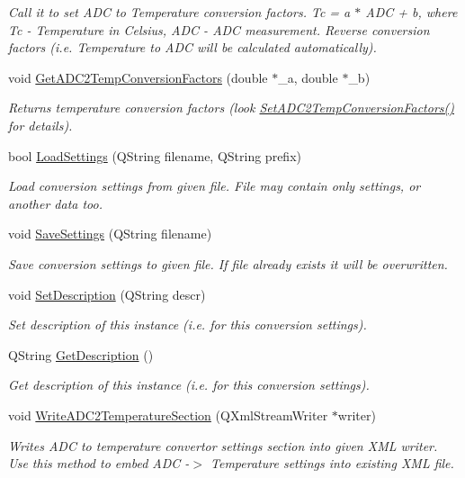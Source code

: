 \begin{DoxyCompactItemize}
\begin{DoxyCompactList}\small\item\em Call it to set A\+DC to Temperature conversion factors. Tc = a $\ast$ A\+DC + b, where Tc -\/ Temperature in Celsius, A\+DC -\/ A\+DC measurement. Reverse conversion factors (i.\+e. Temperature to A\+DC will be calculated automatically). \end{DoxyCompactList}\item 
void \hyperlink{class_adc_temperature_convertor_af7c23effdc32aa35c14813fd334572f2}{Get\+A\+D\+C2\+Temp\+Conversion\+Factors} (double $\ast$\+\_\+a, double $\ast$\+\_\+b)
\begin{DoxyCompactList}\small\item\em Returns temperature conversion factors (look \hyperlink{class_adc_temperature_convertor_a4850843e55992608213cc9cf82d36830}{Set\+A\+D\+C2\+Temp\+Conversion\+Factors()} for details). \end{DoxyCompactList}\item 
bool \hyperlink{class_adc_temperature_convertor_ac45f10e678aa2f9e25c5351dfd283de0}{Load\+Settings} (Q\+String filename, Q\+String prefix)
\begin{DoxyCompactList}\small\item\em Load conversion settings from given file. File may contain only settings, or another data too. \end{DoxyCompactList}\item 
void \hyperlink{class_adc_temperature_convertor_aa6935469c6bb9e2df9a21495d7e8b72a}{Save\+Settings} (Q\+String filename)
\begin{DoxyCompactList}\small\item\em Save conversion settings to given file. If file already exists it will be overwritten. \end{DoxyCompactList}\item 
void \hyperlink{class_adc_temperature_convertor_a56103443d7da4769339ddb685a0a8df0}{Set\+Description} (Q\+String descr)
\begin{DoxyCompactList}\small\item\em Set description of this instance (i.\+e. for this conversion settings). \end{DoxyCompactList}\item 
Q\+String \hyperlink{class_adc_temperature_convertor_ad82afdddbac46a95b6da44e769180d10}{Get\+Description} ()
\begin{DoxyCompactList}\small\item\em Get description of this instance (i.\+e. for this conversion settings). \end{DoxyCompactList}\item 
void \hyperlink{class_adc_temperature_convertor_aa06c19d0ac9f45d6f2f67718eda042ac}{Write\+A\+D\+C2\+Temperature\+Section} (Q\+Xml\+Stream\+Writer $\ast$writer)
\begin{DoxyCompactList}\small\item\em Writes A\+DC to temperature convertor settings section into given X\+ML writer. Use this method to embed A\+DC -\/$>$ Temperature settings into existing X\+ML file. \end{DoxyCompactList}\end{DoxyCompactItemize}
